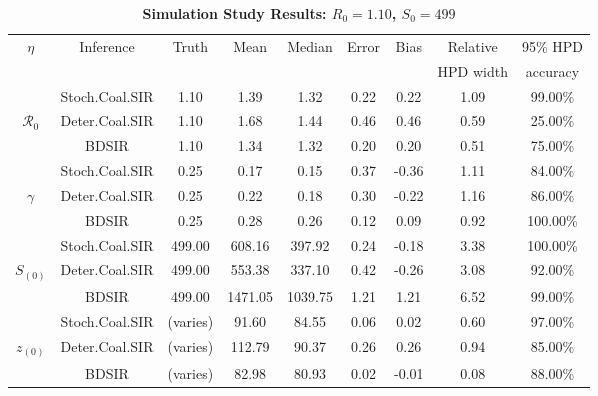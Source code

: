 \documentclass[10pt]{article}
\begin{document}
\begin{table}[!ht]
\begin{center}
\caption{\bf{Simulation Study Results: $R_{0}=1.10$, $S_{0}=499$}}
\begin{tabular}{|c|c|c|c|c|c|c|c|c|}
\hline
$\eta$ & Inference & Truth & Mean & Median & Error & Bias & Relative & 95\% HPD \\ 
&  &  &  &  &  &  &  HPD width & accuracy \\ 
	\hline
	\hline
 & Stoch.Coal.SIR & 1.10 & 1.39 & 1.32 & 0.22 & 0.22 & 1.09 & 99.00\% \\
$\mathcal{R}_0$ & Deter.Coal.SIR & 1.10 & 1.68 & 1.44 & 0.46 & 0.46 & 0.59 & 25.00\% \\
 & BDSIR & 1.10 & 1.34 & 1.32 & 0.20 & 0.20 & 0.51 & 75.00\% \\
   \hline
   \hline 
 & Stoch.Coal.SIR & 0.25 & 0.17 & 0.15 & 0.37 & -0.36 & 1.11 & 84.00\% \\
$\gamma$ & Deter.Coal.SIR & 0.25 & 0.22 & 0.18 & 0.30 & -0.22 & 1.16 & 86.00\% \\
 & BDSIR & 0.25 & 0.28 & 0.26 & 0.12 & 0.09 & 0.92 & 100.00\% \\
   \hline
   \hline
 & Stoch.Coal.SIR & 499.00 & 608.16 & 397.92 & 0.24 & -0.18 & 3.38 & 100.00\% \\
$S_{(0)}$ & Deter.Coal.SIR & 499.00 & 553.38 & 337.10 & 0.42 & -0.26 & 3.08 & 92.00\% \\
 & BDSIR & 499.00 & 1471.05 & 1039.75 & 1.21 & 1.21 & 6.52 & 99.00\% \\
   \hline
   \hline
 & Stoch.Coal.SIR & (varies) & 91.60 & 84.55 & 0.06 & 0.02 & 0.60 & 97.00\% \\
$z_{(0)}$ & Deter.Coal.SIR & (varies) & 112.79 & 90.37 & 0.26 & 0.26 & 0.94 & 85.00\% \\
 & BDSIR & (varies) & 82.98 & 80.93 & 0.02 & -0.01 & 0.08 & 88.00\% \\
   \hline
\end{tabular}
\end{center}
\label{table:simLowerS0}
 \end{table}
\end{document}
